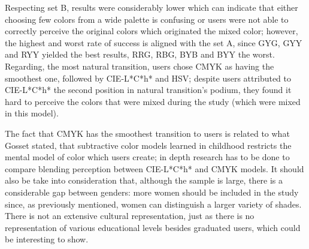 Respecting set B, results were considerably lower which can indicate that either choosing few colors from
a wide palette is confusing or users were not able to correctly perceive the original colors which originated
the mixed color; however, the highest and worst rate of success is aligned with the set A, since GYG, GYY
and RYY yielded the best results, RRG, RBG, BYB and BYY the worst. Regarding, the most natural transition,
users chose CMYK as having the smoothest one, followed by CIE-L*C*h* and HSV; despite users attributed to
CIE-L*C*h* the second position in natural transition’s podium, they found it hard to perceive the colors
that were mixed during the study (which were mixed in this model). \par
%
The fact that CMYK has the smoothest transition to users is related to what Gosset \cite{Gossett2004} stated, that
subtractive color models learned in childhood restricts the mental model of color which users create;
in depth research has to be done to compare blending perception between CIE-L*C*h* and CMYK models. It
should also be take into consideration that, although the sample is large, there is a considerable gap
between genders: more women should be included in the study since, as previously mentioned, women can
distinguish a larger variety of shades. There is not an extensive cultural representation, just as there
is no representation of various educational levels besides graduated users, which could be interesting to show. \par
%
\newpage
